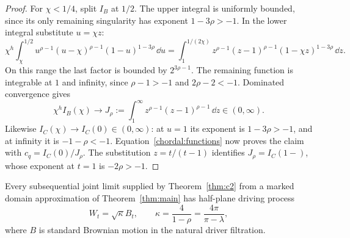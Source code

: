 \begin{proof}
For $\chi<1/4$, split $I_B$ at $1/2$.  The upper integral is
uniformly bounded, since its only remaining singularity has
exponent $1-3\rho>-1$.  In the lower integral substitute $u=\chi z$:
\[
 \chi^h\int_\chi^{1/2}
 u^{\rho-1}(u-\chi)^{\rho-1}(1-u)^{1-3\rho}\,\dd u
 =\int_1^{1/(2\chi)}
 z^{\rho-1}(z-1)^{\rho-1}(1-\chi z)^{1-3\rho}\,\dd z.
\]
On this range the last factor is bounded by $2^{3\rho-1}$.
The remaining function is integrable at $1$ and infinity, since
$\rho-1>-1$ and $2\rho-2<-1$.  Dominated convergence gives
\[
 \chi^h I_B(\chi)\longrightarrow
 J_\rho:=\int_1^\infty z^{\rho-1}(z-1)^{\rho-1}\,\dd z
 \in(0,\infty).
\]
Likewise $I_C(\chi)\to I_C(0)\in(0,\infty)$: at $u=1$ its
exponent is $1-3\rho>-1$, and at infinity it is $-1-\rho<-1$.
Equation~\eqref{chordal:functions} now proves the claim with
$c_q=I_C(0)/J_\rho$.  The substitution $z=t/(t-1)$ identifies
$J_\rho=I_C(1-)$, whose exponent at $t=1$ is $-2\rho>-1$.
\end{proof}

\begin{proposition}\label{prop:driver}
Every subsequential joint limit supplied by Theorem~\ref{thm:c2}
from a marked domain approximation of Theorem~\ref{thm:main}
has half-plane driving process
\[
 W_t=\sqrt\kappa B_t,\qquad
 \kappa=\frac4{1-\rho}=\frac{4\pi}{\pi-\lambda},
\]
where $B$ is standard Brownian motion in the natural driver filtration.
\end{proposition}

